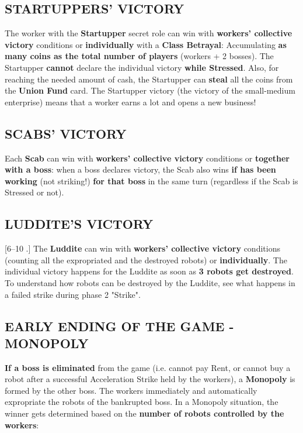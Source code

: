     \subsection{STARTUPPERS' VICTORY}
    
        The worker with the \textbf{Startupper} secret role can win with \textbf{workers' collective victory}
        conditions or \textbf{individually} with a \textbf{Class Betrayal}: Accumulating \textbf{as many
        coins as the total number of players} (workers + 2 bosses). The Startupper \textbf{cannot} declare
        the individual victory \textbf{while Stressed}. Also, for reaching the needed
        amount of cash, the Startupper can \textbf{steal} all the coins from the \textbf{Union Fund} card.
        The Startupper victory (the victory of the small-medium enterprise) means that a
        worker earns a lot and opens a new business!
    
    \subsection{SCABS' VICTORY}
    
        Each \textbf{Scab} can win with \textbf{workers' collective victory} conditions or \textbf{together with
        a boss}: when a boss declares victory, the Scab also wins \textbf{if has been working} (not
        striking!) \textbf{for that boss} in the same turn (regardless if the Scab is Stressed or not).
    
    \subsection{LUDDITE'S VICTORY}
    
        [6–10 \faPeopleGroup.] The \textbf{Luddite} can win with \textbf{workers' collective victory} conditions
        (counting all the expropriated and the destroyed robots) or \textbf{individually}. The
        individual victory happens for the Luddite as soon as \textbf{3 robots get destroyed}. To
        understand how robots can be destroyed by the Luddite, see what happens in a
        failed strike during phase 2 "Strike".
    
    \subsection{EARLY ENDING OF THE GAME - MONOPOLY}

        \textbf{If a boss is eliminated} from the game (i.e. cannot pay Rent, or cannot buy a
        robot after a successful Acceleration Strike held by the workers), a \textbf{Monopoly} is
        formed by the other boss. The workers immediately and automatically expropriate
        the robots of the bankrupted boss.
        In a Monopoly situation, the winner gets determined based on the \textbf{number of
        robots controlled by the workers}:

